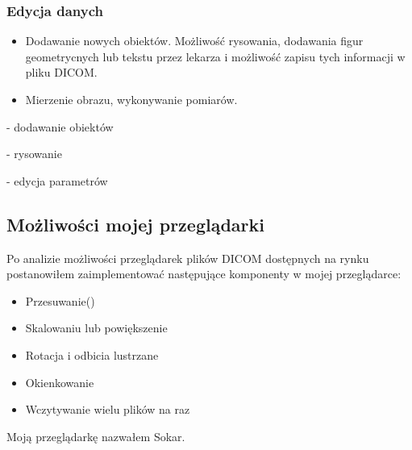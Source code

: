 \subsubsection{Edycja danych}

\begin{itemize}
    \item Dodawanie nowych obiektów.
          Możliwość rysowania, dodawania figur geometrycnych lub tekstu przez lekarza i możliwość zapisu tych informacji w pliku DICOM.

    \item Mierzenie obrazu, wykonywanie pomiarów.
\end{itemize}


- dodawanie obiektów

- rysowanie

- edycja parametrów


\subsection{Możliwości mojej przeglądarki}

Po analizie możliwości przeglądarek plików DICOM dostępnych na rynku postanowiłem zaimplementować następujące komponenty w mojej przeglądarce:

\begin{itemize}
    \item Przesuwanie()

    \item Skalowaniu lub powiększenie

    \item Rotacja i odbicia lustrzane

    \item Okienkowanie

    \item Wczytywanie wielu plików na raz
\end{itemize}

Moją przeglądarkę nazwałem Sokar.